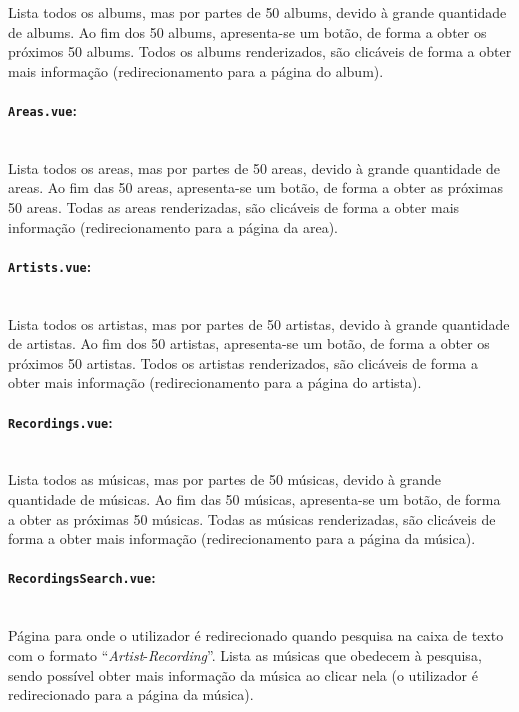 \documentclass{article}
\begin{document}
Lista todos os albums, mas por partes de 50 albums, devido à grande quantidade de albums. Ao fim dos 50 albums, apresenta-se um botão, de forma a obter os próximos 50 albums. Todos os albums renderizados, são clicáveis de forma a obter mais informação (redirecionamento para a página do album).

\paragraph{\texttt{Areas.vue}:}\mbox{}\\

Lista todos os areas, mas por partes de 50 areas, devido à grande quantidade de areas. Ao fim das 50 areas, apresenta-se um botão, de forma a obter as próximas 50 areas. Todas as areas renderizadas, são clicáveis de forma a obter mais informação (redirecionamento para a página da area).

\paragraph{\texttt{Artists.vue}:}\mbox{}\\

Lista todos os artistas, mas por partes de 50 artistas, devido à grande quantidade de artistas. Ao fim dos 50 artistas, apresenta-se um botão, de forma a obter os próximos 50 artistas. Todos os artistas renderizados, são clicáveis de forma a obter mais informação (redirecionamento para a página do artista).

\paragraph{\texttt{Recordings.vue}:}\mbox{}\\

Lista todos as músicas, mas por partes de 50 músicas, devido à grande quantidade de músicas. Ao fim das 50 músicas, apresenta-se um botão, de forma a obter as próximas 50 músicas. Todas as músicas renderizadas, são clicáveis de forma a obter mais informação (redirecionamento para a página da música).

\paragraph{\texttt{RecordingsSearch.vue}:}\mbox{}\\

Página para onde o utilizador é redirecionado quando pesquisa na caixa de texto com o formato ``\textit{Artist}-\textit{Recording}''. Lista as músicas que obedecem à pesquisa, sendo possível obter mais informação da música ao clicar nela (o utilizador é redirecionado para a página da música).
\end{document}
